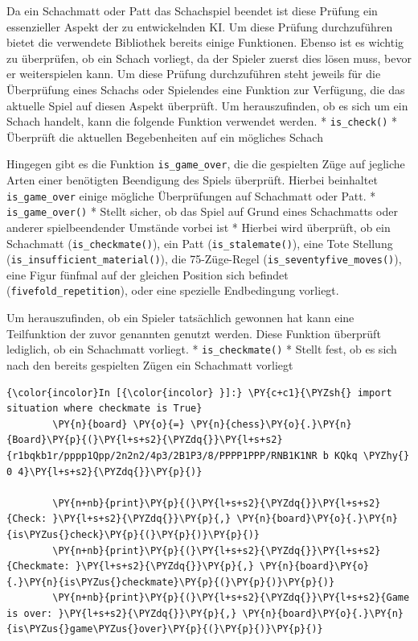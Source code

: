 Da ein Schachmatt oder Patt das Schachspiel beendet ist diese Prüfung
ein essenzieller Aspekt der zu entwickelnden KI. Um diese Prüfung
durchzuführen bietet die verwendete Bibliothek bereits einige
Funktionen. Ebenso ist es wichtig zu überprüfen, ob ein Schach vorliegt,
da der Spieler zuerst dies lösen muss, bevor er weiterspielen kann. Um
diese Prüfung durchzuführen steht jeweils für die Überprüfung eines
Schachs oder Spielendes eine Funktion zur Verfügung, die das aktuelle
Spiel auf diesen Aspekt überprüft. Um herauszufinden, ob es sich um ein
Schach handelt, kann die folgende Funktion verwendet werden. *
\texttt{is\_check()} * Überprüft die aktuellen Begebenheiten auf ein
mögliches Schach

Hingegen gibt es die Funktion \texttt{is\_game\_over}, die die
gespielten Züge auf jegliche Arten einer benötigten Beendigung des
Spiels überprüft. Hierbei beinhaltet \texttt{is\_game\_over} einige
mögliche Überprüfungen auf Schachmatt oder Patt. *
\texttt{is\_game\_over()} * Stellt sicher, ob das Spiel auf Grund eines
Schachmatts oder anderer spielbeendender Umstände vorbei ist * Hierbei
wird überprüft, ob ein Schachmatt (\texttt{is\_checkmate()}), ein Patt
(\texttt{is\_stalemate()}), eine Tote Stellung
(\texttt{is\_insufficient\_material()}), die 75-Züge-Regel
(\texttt{is\_seventyfive\_moves()}), eine Figur fünfmal auf der gleichen
Position sich befindet (\texttt{fivefold\_repetition}), oder eine
spezielle Endbedingung vorliegt.

Um herauszufinden, ob ein Spieler tatsächlich gewonnen hat kann eine
Teilfunktion der zuvor genannten genutzt werden. Diese Funktion
überprüft lediglich, ob ein Schachmatt vorliegt. *
\texttt{is\_checkmate()} * Stellt fest, ob es sich nach den bereits
gespielten Zügen ein Schachmatt vorliegt

    \begin{Verbatim}[commandchars=\\\{\}]
{\color{incolor}In [{\color{incolor} }]:} \PY{c+c1}{\PYZsh{} import situation where checkmate is True}
        \PY{n}{board} \PY{o}{=} \PY{n}{chess}\PY{o}{.}\PY{n}{Board}\PY{p}{(}\PY{l+s+s2}{\PYZdq{}}\PY{l+s+s2}{r1bqkb1r/pppp1Qpp/2n2n2/4p3/2B1P3/8/PPPP1PPP/RNB1K1NR b KQkq \PYZhy{} 0 4}\PY{l+s+s2}{\PYZdq{}}\PY{p}{)}
        
        \PY{n+nb}{print}\PY{p}{(}\PY{l+s+s2}{\PYZdq{}}\PY{l+s+s2}{Check: }\PY{l+s+s2}{\PYZdq{}}\PY{p}{,} \PY{n}{board}\PY{o}{.}\PY{n}{is\PYZus{}check}\PY{p}{(}\PY{p}{)}\PY{p}{)}
        \PY{n+nb}{print}\PY{p}{(}\PY{l+s+s2}{\PYZdq{}}\PY{l+s+s2}{Checkmate: }\PY{l+s+s2}{\PYZdq{}}\PY{p}{,} \PY{n}{board}\PY{o}{.}\PY{n}{is\PYZus{}checkmate}\PY{p}{(}\PY{p}{)}\PY{p}{)}
        \PY{n+nb}{print}\PY{p}{(}\PY{l+s+s2}{\PYZdq{}}\PY{l+s+s2}{Game is over: }\PY{l+s+s2}{\PYZdq{}}\PY{p}{,} \PY{n}{board}\PY{o}{.}\PY{n}{is\PYZus{}game\PYZus{}over}\PY{p}{(}\PY{p}{)}\PY{p}{)}
\end{Verbatim}


